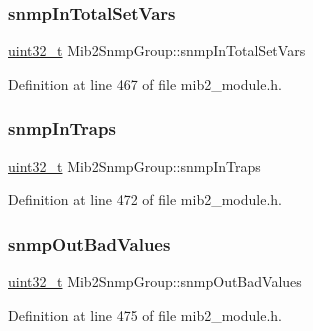 \mbox{\label{structMib2SnmpGroup_adc6f3d967713055033959286681b149e}} 
\subsubsection{\texorpdfstring{snmp\+In\+Total\+Set\+Vars}{snmpInTotalSetVars}}
{\footnotesize\ttfamily \hyperlink{stdint_8h_a435d1572bf3f880d55459d9805097f62}{uint32\+\_\+t} Mib2\+Snmp\+Group\+::snmp\+In\+Total\+Set\+Vars}



Definition at line 467 of file mib2\+\_\+module.\+h.

\mbox{\label{structMib2SnmpGroup_a8e53326ef2d77abc82f6ada1b69d7d9f}} 
\subsubsection{\texorpdfstring{snmp\+In\+Traps}{snmpInTraps}}
{\footnotesize\ttfamily \hyperlink{stdint_8h_a435d1572bf3f880d55459d9805097f62}{uint32\+\_\+t} Mib2\+Snmp\+Group\+::snmp\+In\+Traps}



Definition at line 472 of file mib2\+\_\+module.\+h.

\mbox{\label{structMib2SnmpGroup_a841525a66d6ec673d3faa1bd60c4b3ab}} 
\subsubsection{\texorpdfstring{snmp\+Out\+Bad\+Values}{snmpOutBadValues}}
{\footnotesize\ttfamily \hyperlink{stdint_8h_a435d1572bf3f880d55459d9805097f62}{uint32\+\_\+t} Mib2\+Snmp\+Group\+::snmp\+Out\+Bad\+Values}



Definition at line 475 of file mib2\+\_\+module.\+h.

